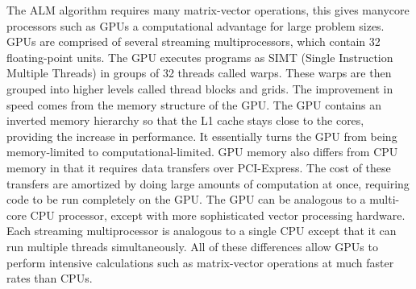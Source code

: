 \documentclass[10pt,twocolumn,letterpaper]{article}
\begin{document}
The ALM algorithm requires many matrix-vector operations, this gives manycore processors such as GPUs a computational advantage for large problem sizes.  
GPUs are comprised of several streaming multiprocessors, which contain 32 floating-point units.  The GPU executes programs as SIMT (Single Instruction Multiple Threads) in groups of 32 threads called warps.  These warps are then grouped into higher levels called thread blocks and grids.  The improvement in speed comes from the memory structure of the GPU.   The GPU contains an inverted memory hierarchy so that the L1 cache stays close to the cores, providing the increase in performance.  It essentially turns the GPU from being memory-limited to computational-limited.
GPU memory also differs from CPU memory in that it requires data transfers over PCI-Express.  The cost of these transfers are amortized by doing large amounts of computation at once, requiring code to be run completely on the GPU.  The GPU can be analogous to a multi-core CPU processor, except with more sophisticated vector processing hardware.  Each streaming multiprocessor is analogous to a single CPU except that it can run multiple threads simultaneously.
All of these differences allow GPUs to perform intensive calculations such as matrix-vector operations at much faster rates than CPUs.




\end{document}
